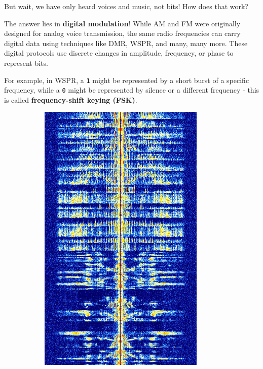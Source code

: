 But wait, we have only heard voices and music, not bits! How does that work?

The answer lies in \textbf{digital modulation}! While AM and FM were originally designed for analog voice transmission, the same radio frequencies can carry digital data using techniques like DMR, WSPR, and many, many more.
These digital protocols use discrete changes in amplitude, frequency, or phase to represent bits.

For example, in WSPR, a \texttt{1} might be represented by a short burst of a specific frequency, while a \texttt{0} might be represented by silence or a different frequency - this is called \textbf{frequency-shift keying (FSK)}.


\begin{figure}[h]
    \centering
    \begin{subfigure}[b]{0.2\textwidth}
        \centering
        \includegraphics[width=\textwidth]{assets/osi/physical/signals/am_voice.png}

\end{subfigure}
\end{figure}

